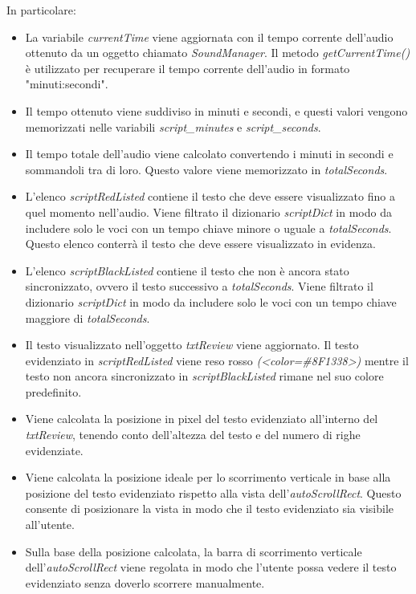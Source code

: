 \begin{itemize}
In particolare:
	\begin{itemize}
		\item La variabile \textit{currentTime} viene aggiornata con il tempo corrente dell'audio ottenuto da un oggetto chiamato \textit{SoundManager}. Il metodo \textit{getCurrentTime()} è utilizzato per recuperare il tempo corrente dell'audio in formato "minuti:secondi".
		\item Il tempo ottenuto viene suddiviso in minuti e secondi, e questi valori vengono memorizzati nelle variabili \textit{script\_minutes} e \textit{script\_seconds}.
		\item Il tempo totale dell'audio viene calcolato convertendo i minuti in secondi e sommandoli tra di loro. Questo valore viene memorizzato in \textit{totalSeconds}.
		\item L'elenco \textit{scriptRedListed} contiene il testo che deve essere visualizzato fino a quel momento nell'audio. Viene filtrato il dizionario \textit{scriptDict} in modo da includere solo le voci con un tempo chiave minore o uguale a \textit{totalSeconds}. Questo elenco conterrà il testo che deve essere visualizzato in evidenza.
		\item L'elenco \textit{scriptBlackListed} contiene il testo che non è ancora stato sincronizzato, ovvero il testo successivo a \textit{totalSeconds}. Viene filtrato il dizionario \textit{scriptDict} in modo da includere solo le voci con un tempo chiave maggiore di \textit{totalSeconds}.
		\item Il testo visualizzato nell'oggetto \textit{txtReview} viene aggiornato. Il testo evidenziato in \textit{scriptRedListed} viene reso rosso \textit{(<color=\#8F1338>)} mentre il testo non ancora sincronizzato in \textit{scriptBlackListed} rimane nel suo colore predefinito.
		\item Viene calcolata la posizione in pixel del testo evidenziato all'interno del \textit{txtReview}, tenendo conto dell'altezza del testo e del numero di righe evidenziate.
		\item Viene calcolata la posizione ideale per lo scorrimento verticale in base alla posizione del testo evidenziato rispetto alla vista dell'\textit{autoScrollRect}. Questo consente di posizionare la vista in modo che il testo evidenziato sia visibile all'utente.
		\item Sulla base della posizione calcolata, la barra di scorrimento verticale dell'\textit{autoScrollRect} viene regolata in modo che l'utente possa vedere il testo evidenziato senza doverlo scorrere manualmente.
	\end{itemize}
\end{itemize}


